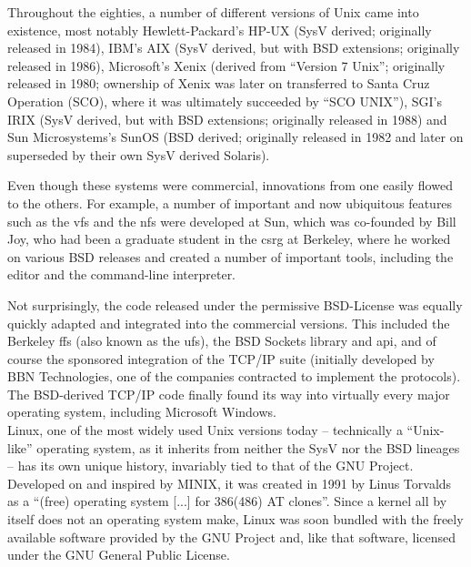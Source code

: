 Throughout the eighties, a number of different
versions of Unix came into existence, most notably
Hewlett-Packard's
HP-UX (SysV derived; originally released
in 1984),  IBM's  AIX (SysV
derived, but with BSD extensions; originally released
in 1986),  Microsoft's
Xenix (derived from ``Version 7 Unix'';
originally released in 1980; ownership of Xenix was
later on transferred to  Santa Cruz
Operation (SCO), where it
was ultimately succeeded by ``SCO UNIX''),
SGI's IRIX (SysV derived, but
with BSD extensions; originally released in 1988) and
Sun Microsystems's
SunOS (BSD derived; originally released
in 1982 and later on superseded by their own SysV
derived Solaris).

Even though these systems were commercial, innovations
from one easily flowed to the others.  For example, a
number of important and now ubiquitous features such
as the \gls{vfs} and the
\gls{nfs} were developed
at Sun, which was co-founded by Bill
Joy, who had been a graduate
student in the \gls{csrg} at Berkeley, where he worked
on various BSD releases and created a number of
important tools, including the  editor
and the  command-line interpreter.

Not surprisingly, the code released under the
permissive
BSD-License\cite{history:bsd-license}
was equally quickly adapted and integrated into the
commercial versions.  This included the Berkeley
\gls{ffs} (also known as the
\gls{ufs}), the BSD
Sockets library and \gls{api}, and of
course the 
sponsored integration of the  TCP/IP
suite (initially developed by  BBN
Technologies, one of the
companies contracted to implement the protocols).  The
BSD-derived TCP/IP code finally found its way into
virtually every major operating system, including
Microsoft Windows.  \\

Linux, one of the most widely used Unix versions today
-- technically a ``Unix-like'' operating system, as it
inherits from neither the SysV nor the BSD lineages --
has its own unique history, invariably tied to that of
the GNU Project.  Developed on and
inspired by MINIX, it was created in 1991
by Linus Torvalds as a ``(free)
operating system [...] for 386(486) AT
clones''\cite{history:torvalds-announce}.  Since a
kernel all by itself does not an operating system
make, Linux was soon bundled with the freely available
software provided by the GNU Project and, like that
software, licensed under the GNU General Public
License.


